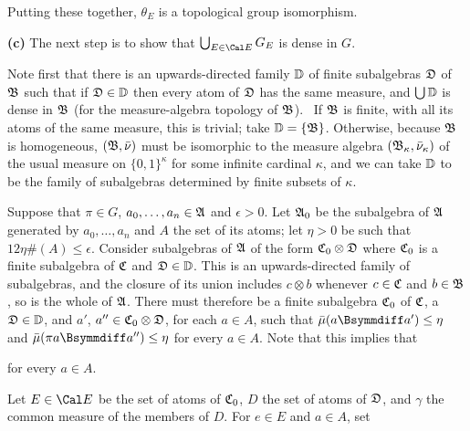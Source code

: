 {\medskip

 Putting these together, $\theta_E$ is a topological group
isomorphism.

\medskip

{\bf (c)} The next step is to show that $\bigcup_{E\in\Cal E}G_E$ is dense
in $G$.

\medskip

 Note first that there is an upwards-directed
family $\Bbb D$ of finite
subalgebras $\frak D$ of $\frak B$ such that if $\frak D\in\Bbb D$ then
every atom of $\frak D$ has the same measure, and $\bigcup\Bbb D$ is dense
in $\frak B$ (for the measure-algebra topology of $\frak B$).
\Prf\ If $\frak B$ is finite, with all its atoms of the same measure,
this is trivial;  take $\Bbb D=\{\frak B\}$.
Otherwise, because $\frak B$ is homogeneous, $(\frak B,\bar\nu)$ must be
isomorphic to the measure algebra $(\frak B_{\kappa},\bar\nu_{\kappa})$
of the usual measure on $\{0,1\}^{\kappa}$ for some infinite
cardinal $\kappa$, and we can take $\Bbb D$ to be the family of subalgebras
determined by finite subsets of $\kappa$.\ \Qed

\medskip

 Suppose that $\pi\in G$,
$a_0,\ldots,a_n\in\frak A$ and $\epsilon>0$.
Let $\frak A_0$ be the
subalgebra of $\frak A$ generated by $a_0,\ldots,a_n$ and $A$ the set of
its atoms;  let $\eta>0$ be such that $12\eta\#(A)\le\epsilon$.
Consider subalgebras of
$\frak A$ of the form $\frak C_0\otimes\frak D$ where $\frak C_0$ is a
finite subalgebra of $\frak C$ and $\frak D\in\Bbb D$.   This is an
upwards-directed family of subalgebras, and the closure of its union
includes $c\otimes b$ whenever $c\in\frak C$ and $b\in\frak B$,
so is the whole of $\frak A$.   There must therefore be a finite subalgebra
$\frak C_0$ of $\frak C$, a $\frak D\in\Bbb D$, and
$a'$, $a''\in\frak C_0\otimes\frak D$, for each $a\in A$, such that
$\bar\mu(a\Bsymmdiff a')\le\eta$ and
$\bar\mu(\pi a\Bsymmdiff a'')\le\eta$ for every $a\in A$.
Note that this implies that


\noindent for every $a\in A$.

\medskip

Let $E\in\Cal E$ be the set of atoms of $\frak C_0$,
$D$ the set of atoms of
$\frak D$, and $\gamma$ the common measure of the members of $D$.   For
$e\in E$ and $a\in A$, set

}
